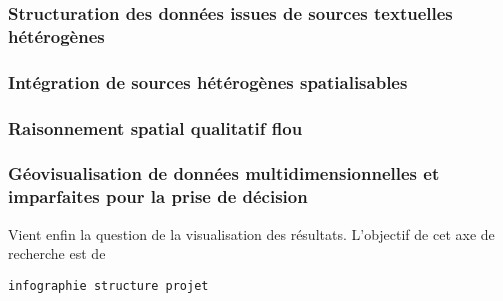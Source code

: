 \subsubsection{Structuration des données issues de sources textuelles
  hétérogènes}

\subsubsection{Intégration de sources hétérogènes spatialisables}

\subsubsection{Raisonnement spatial qualitatif flou}


\subsubsection{Géovisualisation de données multidimensionnelles et
  imparfaites pour la prise de décision}

Vient enfin la question de la visualisation des résultats. L'objectif
de cet axe de recherche est de 


\texttt{infographie structure projet}
